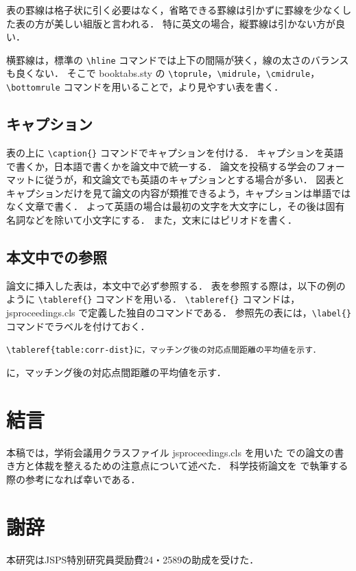 \documentclass[uplatex, twocolumn, 9pt]{jsproceedings}
\begin{document}
表の罫線は格子状に引く必要はなく，省略できる罫線は引かずに罫線を少なくした表の方が美しい組版と言われる．
特に英文の場合，縦罫線は引かない方が良い．

横罫線は，標準の \verb*|\hline| コマンドでは上下の間隔が狭く，線の太さのバランスも良くない．
そこで booktabs.sty の \verb*|\toprule|，\verb*|\midrule|，\verb*|\cmidrule|，\verb*|\bottomrule| コマンドを用いることで，より見やすい表を書く．

\subsection{キャプション}
表の上に \verb*|\caption{}| コマンドでキャプションを付ける．
キャプションを英語で書くか，日本語で書くかを論文中で統一する．
論文を投稿する学会のフォーマットに従うが，和文論文でも英語のキャプションとする場合が多い．
図表とキャプションだけを見て論文の内容が類推できるよう，キャプションは単語ではなく文章で書く．
よって英語の場合は最初の文字を大文字にし，その後は固有名詞などを除いて小文字にする．
また，文末にはピリオドを書く．

\subsection{本文中での参照}
論文に挿入した表は，本文中で必ず参照する．
表を参照する際は，以下の例のように \verb*|\tableref{}| コマンドを用いる．
\verb*|\tableref{}| コマンドは，jsproceedings.cls で定義した独自のコマンドである．
参照先の表には，\verb*|\label{}| コマンドでラベルを付けておく．
\begin{description}[style=nextline]
  \item[\LaTeX ソース]%
  \verb|\tableref{table:corr-dist}に，マッチング後の対応点間距離の平均値を示す．|
  \item[出力]%
  に，マッチング後の対応点間距離の平均値を示す．
\end{description}


\section{結言}
本稿では，学術会議用クラスファイル jsproceedings.cls を用いた \LaTeXe での論文の書き方と体裁を整えるための注意点について述べた．
科学技術論文を \LaTeXe で執筆する際の参考になれば幸いである．

\section*{謝辞}
本研究はJSPS特別研究員奨励費24・2589の助成を受けた．
\end{document}
